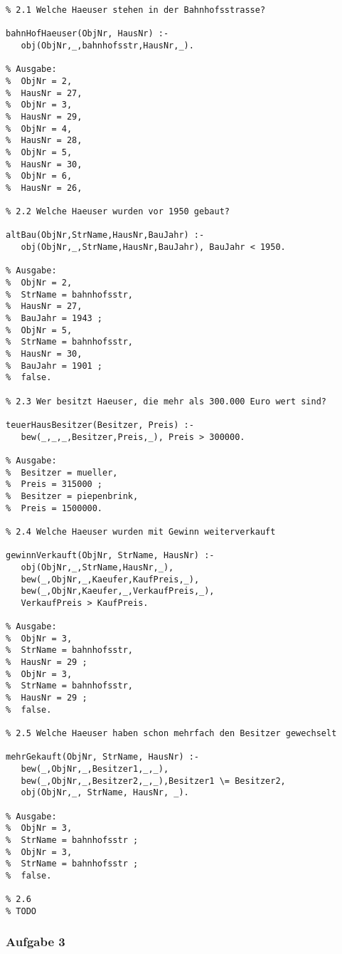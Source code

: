 \documentclass[]{article}
\begin{document}
\begin{verbatim}
% 2.1 Welche Haeuser stehen in der Bahnhofsstrasse?

bahnHofHaeuser(ObjNr, HausNr) :-
   obj(ObjNr,_,bahnhofsstr,HausNr,_).

% Ausgabe: 
%  ObjNr = 2,
%  HausNr = 27,
%  ObjNr = 3,
%  HausNr = 29,
%  ObjNr = 4,
%  HausNr = 28,
%  ObjNr = 5,
%  HausNr = 30,
%  ObjNr = 6,
%  HausNr = 26,

% 2.2 Welche Haeuser wurden vor 1950 gebaut?

altBau(ObjNr,StrName,HausNr,BauJahr) :- 
   obj(ObjNr,_,StrName,HausNr,BauJahr), BauJahr < 1950.
   
% Ausgabe: 
%  ObjNr = 2,
%  StrName = bahnhofsstr,
%  HausNr = 27,
%  BauJahr = 1943 ;
%  ObjNr = 5,
%  StrName = bahnhofsstr,
%  HausNr = 30,
%  BauJahr = 1901 ;
%  false.

% 2.3 Wer besitzt Haeuser, die mehr als 300.000 Euro wert sind?

teuerHausBesitzer(Besitzer, Preis) :-
   bew(_,_,_,Besitzer,Preis,_), Preis > 300000.
   
% Ausgabe:
%  Besitzer = mueller,
%  Preis = 315000 ;
%  Besitzer = piepenbrink,
%  Preis = 1500000.

% 2.4 Welche Haeuser wurden mit Gewinn weiterverkauft

gewinnVerkauft(ObjNr, StrName, HausNr) :- 
   obj(ObjNr,_,StrName,HausNr,_),
   bew(_,ObjNr,_,Kaeufer,KaufPreis,_), 
   bew(_,ObjNr,Kaeufer,_,VerkaufPreis,_),
   VerkaufPreis > KaufPreis.
   
% Ausgabe:
%  ObjNr = 3,
%  StrName = bahnhofsstr,
%  HausNr = 29 ;
%  ObjNr = 3,
%  StrName = bahnhofsstr,
%  HausNr = 29 ;
%  false.

% 2.5 Welche Haeuser haben schon mehrfach den Besitzer gewechselt

mehrGekauft(ObjNr, StrName, HausNr) :- 
   bew(_,ObjNr,_,Besitzer1,_,_),
   bew(_,ObjNr,_,Besitzer2,_,_),Besitzer1 \= Besitzer2,
   obj(ObjNr,_, StrName, HausNr, _).
   
% Ausgabe:
%  ObjNr = 3,
%  StrName = bahnhofsstr ;
%  ObjNr = 3,
%  StrName = bahnhofsstr ;
%  false.

% 2.6
% TODO
\end{verbatim}

\subsubsection{Aufgabe 3}\label{header-n108}
\end{document}
